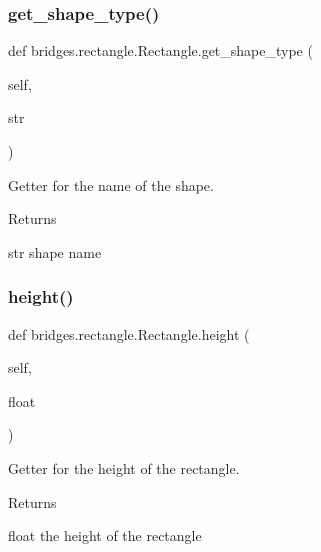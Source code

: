 \subsubsection{\texorpdfstring{get\+\_\+shape\+\_\+type()}{get\_shape\_type()}}
{\footnotesize\ttfamily def bridges.\+rectangle.\+Rectangle.\+get\+\_\+shape\+\_\+type (\begin{DoxyParamCaption}\item[{}]{self,  }\item[{}]{str }\end{DoxyParamCaption})}



Getter for the name of the shape. 

\begin{DoxyReturn}{Returns}


str shape name 
\end{DoxyReturn}
\mbox{\label{classbridges_1_1rectangle_1_1_rectangle_a74a2af961f5eb512ccd5f7faded6645c}} 
\subsubsection{\texorpdfstring{height()}{height()}\hspace{0.1cm}{\footnotesize\ttfamily [1/2]}}
{\footnotesize\ttfamily def bridges.\+rectangle.\+Rectangle.\+height (\begin{DoxyParamCaption}\item[{}]{self,  }\item[{}]{float }\end{DoxyParamCaption})}



Getter for the height of the rectangle. 

\begin{DoxyReturn}{Returns}


float the height of the rectangle 
\end{DoxyReturn}
\mbox{\label{classbridges_1_1rectangle_1_1_rectangle_ad150b377d0bc9f08c85f7f16643a6bf4}} 
